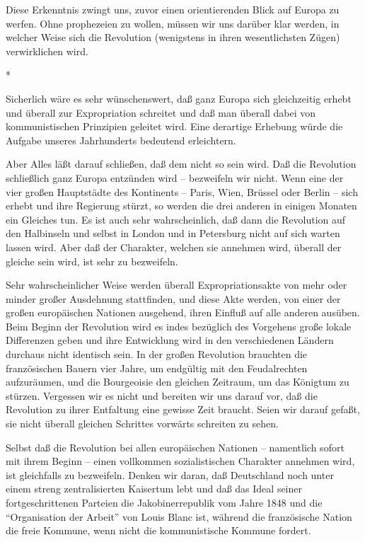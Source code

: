 \documentclass{scrbook}
\begin{document}
Diese Erkenntnis zwingt uns, zuvor einen orientierenden Blick auf Europa zu werfen. Ohne prophezeien zu wollen, müssen wir uns darüber klar werden, in welcher Weise sich die Revolution (wenigstens in ihren wesentlichsten Zügen) verwirklichen wird.

\begin{center}*\end{center}

Sicherlich wäre es sehr wünschenswert, daß ganz Europa sich gleichzeitig erhebt und überall zur Expropriation schreitet und daß man überall dabei von kommunistischen Prinzipien geleitet wird. Eine derartige Erhebung würde die Aufgabe unseres Jahrhunderts bedeutend erleichtern.

Aber Alles läßt darauf schließen, daß dem nicht so sein wird. Daß die Revolution schließlich ganz Europa entzünden wird – bezweifeln wir nicht. Wenn eine der vier großen Hauptstädte des Kontinents – Paris, Wien, Brüssel oder Berlin – sich erhebt und ihre Regierung stürzt, so werden die drei anderen in einigen Monaten ein Gleiches tun. Es ist auch sehr wahrscheinlich, daß dann die Revolution auf den Halbinseln und selbst in London und in Petersburg nicht auf sich warten lassen wird. Aber daß der Charakter, welchen sie annehmen wird, überall der gleiche sein wird, ist sehr zu bezweifeln.

Sehr wahrscheinlicher Weise werden überall Expropriationsakte von mehr oder minder großer Ausdehnung stattfinden, und diese Akte werden, von einer der großen europäischen Nationen ausgehend, ihren Einfluß auf alle anderen ausüben. Beim Beginn der Revolution wird es indes bezüglich des Vorgehens große lokale Differenzen geben und ihre Entwicklung wird in den verschiedenen Ländern durchaus nicht identisch sein. In der großen Revolution brauchten die französischen Bauern vier Jahre, um endgültig mit den Feudalrechten aufzuräumen, und die Bourgeoisie den gleichen Zeitraum, um das Königtum zu stürzen. Vergessen wir es nicht und bereiten wir uns darauf vor, daß die Revolution zu ihrer Entfaltung eine gewisse Zeit braucht. Seien wir darauf gefaßt, sie nicht überall gleichen Schrittes vorwärts schreiten zu sehen.

Selbst daß die Revolution bei allen europäischen Nationen – namentlich sofort mit ihrem Beginn – einen vollkommen sozialistischen Charakter annehmen wird, ist gleichfalls zu bezweifeln. Denken wir daran, daß Deutschland noch unter einem streng zentralisierten Kaisertum lebt und daß das Ideal seiner fortgeschrittenen Parteien die Jakobinerrepublik vom Jahre 1848 und die ``Organisation der Arbeit'' von Louis Blanc ist, während die französische Nation die freie Kommune, wenn nicht die kommunistische Kommune fordert.
\end{document}
